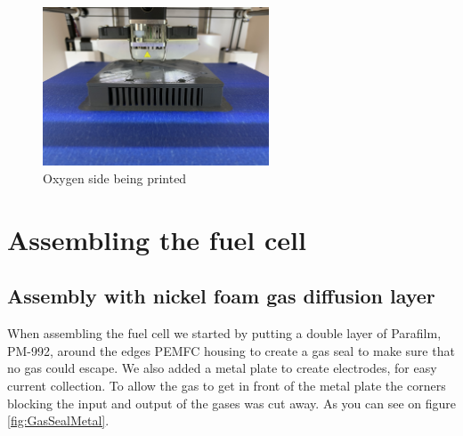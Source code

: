 \begin{figure}[ht]
    \centering
    \includegraphics[width=0.6\textwidth]{DIV./Bilder/FinalPrint.jpg}
    \caption{Oxygen side being printed}
    \label{fig:Housingprint}
\end{figure}

\section{Assembling the fuel cell}

\subsection{Assembly with nickel foam gas diffusion layer}

When assembling the fuel cell we started by putting a double layer of Parafilm, PM-992, around the edges PEMFC housing to create a gas seal to make sure that no gas could escape. We also added a metal plate to create electrodes, for easy current collection. To allow the gas to get in front of the metal plate the corners blocking the input and output of the gases was cut away. As you can see on figure \ref{fig:GasSealMetal}.

